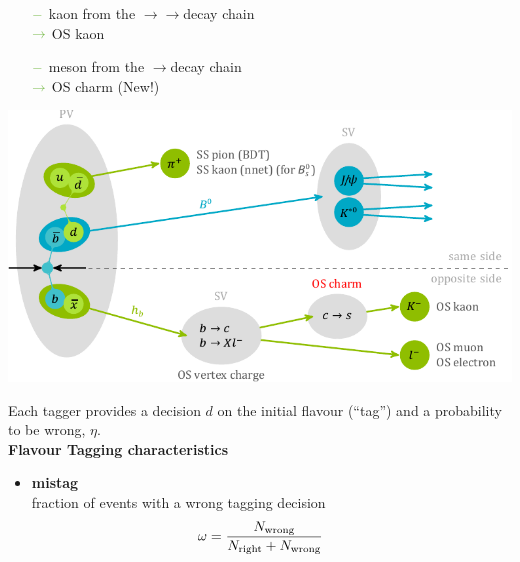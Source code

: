 {\begin{itemize}
\begin{itemize}
\item[${\color{tu_gruen}-}$] kaon from the \bquark$\rightarrow$\cquark$\rightarrow$\squark decay chain \\ ${\color{tu_gruen}\rightarrow}$ OS kaon 
\item[${\color{tu_gruen}-}$] \D meson from the \bquark$\rightarrow$\cquark decay chain \\ ${\color{tu_gruen}\rightarrow}$ OS charm (New!)
\end{itemize}
\end{itemize}
\begin{center}
\includegraphics[width=\textwidth]{FTScheme/FlavourTaggerScheme.pdf}
\end{center}
\vspace{-0.6em}
Each tagger provides a decision $d$ on the initial flavour \newline(“tag”) and a probability to be wrong,  $\eta$.\\[0.3cm]
\vspace{-0.75em}
\textbf{Flavour Tagging characteristics}
\vspace{0.1em}
\begin{itemize}
\item \textbf{mistag} \\[0.04cm] 
fraction of events with a wrong tagging decision
\begin{equation*}
\hspace{-1.6em}
\omega=\frac{N_{\text{wrong}}}{N_{\text{right}}+N_{\text{wrong}}}
\end{equation*}
\vspace{-1.1em}

\end{itemize}}
